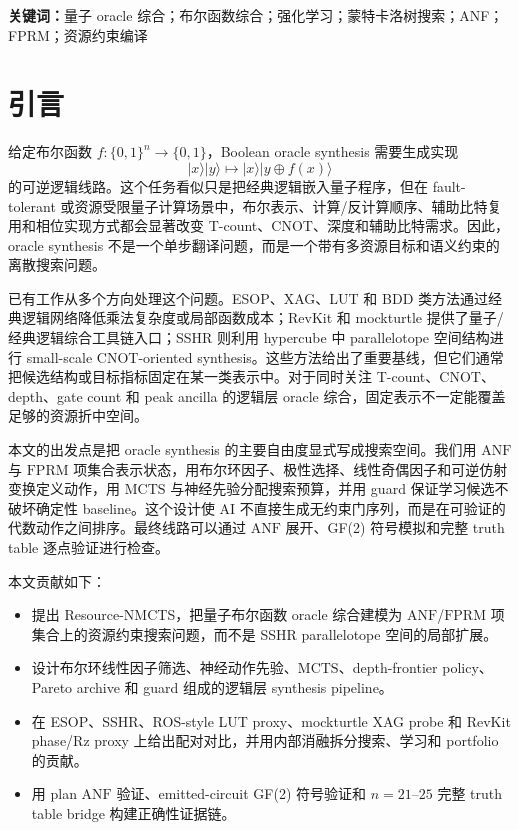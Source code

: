 \documentclass[UTF8,fontset=macnew,11pt]{ctexart}
\newcommand{\method}{Resource-NMCTS}
\newcommand{\anf}{\ensuremath{\mathrm{ANF}}}
\newcommand{\fprm}{\ensuremath{\mathrm{FPRM}}}
\newcommand{\mcts}{\ensuremath{\mathrm{MCTS}}}
\newcommand{\xor}{\ensuremath{\oplus}}
\newcommand{\ttable}{truth table}
\begin{document}
\noindent\textbf{关键词：}量子 oracle 综合；布尔函数综合；强化学习；蒙特卡洛树搜索；ANF；FPRM；资源约束编译

\section{引言}

给定布尔函数 $f:\{0,1\}^n\rightarrow\{0,1\}$，Boolean oracle synthesis 需要生成实现
\begin{equation}
  |x\rangle |y\rangle \mapsto |x\rangle |y\xor f(x)\rangle
  \label{eq:oracle}
\end{equation}
的可逆逻辑线路。这个任务看似只是把经典逻辑嵌入量子程序，但在 fault-tolerant 或资源受限量子计算场景中，布尔表示、计算/反计算顺序、辅助比特复用和相位实现方式都会显著改变 T-count、CNOT、深度和辅助比特需求。因此，oracle synthesis 不是一个单步翻译问题，而是一个带有多资源目标和语义约束的离散搜索问题。

已有工作从多个方向处理这个问题。ESOP、XAG、LUT 和 BDD 类方法通过经典逻辑网络降低乘法复杂度或局部函数成本\cite{wille2009bdd,meuli2020ros,meuli2022xag}；RevKit 和 mockturtle 提供了量子/经典逻辑综合工具链入口\cite{soeken2018epfl,revkit,mockturtle}；SSHR 则利用 hypercube 中 parallelotope 空间结构进行 small-scale CNOT-oriented synthesis\cite{zheng2025sshr}。这些方法给出了重要基线，但它们通常把候选结构或目标指标固定在某一类表示中。对于同时关注 T-count、CNOT、depth、gate count 和 peak ancilla 的逻辑层 oracle 综合，固定表示不一定能覆盖足够的资源折中空间。

本文的出发点是把 oracle synthesis 的主要自由度显式写成搜索空间。我们用 \anf{} 与 \fprm{} 项集合表示状态，用布尔环因子、极性选择、线性奇偶因子和可逆仿射变换定义动作，用 \mcts{} 与神经先验分配搜索预算，并用 guard 保证学习候选不破坏确定性 baseline。这个设计使 AI 不直接生成无约束门序列，而是在可验证的代数动作之间排序。最终线路可以通过 \anf{} 展开、GF(2) 符号模拟和完整 \ttable{} 逐点验证进行检查。

本文贡献如下：
\begin{itemize}
  \item 提出 \method{}，把量子布尔函数 oracle 综合建模为 \anf{}/\fprm{} 项集合上的资源约束搜索问题，而不是 SSHR parallelotope 空间的局部扩展。
  \item 设计布尔环线性因子筛选、神经动作先验、\mcts{}、depth-frontier policy、Pareto archive 和 guard 组成的逻辑层 synthesis pipeline。
  \item 在 ESOP、SSHR、ROS-style LUT proxy、mockturtle XAG probe 和 RevKit phase/Rz proxy 上给出配对对比，并用内部消融拆分搜索、学习和 portfolio 的贡献。
  \item 用 plan \anf{} 验证、emitted-circuit GF(2) 符号验证和 $n=21$--$25$ 完整 \ttable{} bridge 构建正确性证据链。
\end{itemize}
\end{document}
